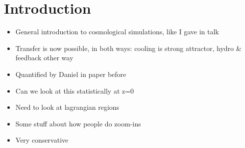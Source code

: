 \section{Introduction}

\begin{itemize}
    \item General introduction to cosmological simulations, like I gave in talk
    \item Transfer is now possible, in both ways: cooling is strong attractor, hydro & feedback other way
    \item Quantified by Daniel in paper before
    \item Can we look at this statistically at z=0
    \item Need to look at lagrangian regions
    \item Some stuff about how people do zoom-ins
    \item Very conservative
\end{itemize}